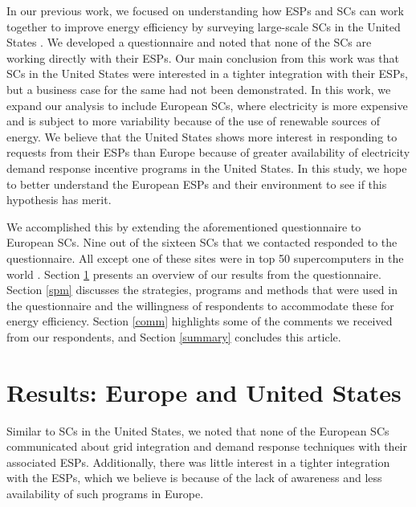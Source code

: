 \documentclass{article}
\begin{document}
In our previous work, we focused on understanding how ESPs and SCs can work together to improve energy efficiency by surveying large-scale SCs in the United States \cite{BatesESP}. We developed a questionnaire and noted that none of the SCs are working directly with their ESPs. Our main conclusion from this work was that SCs in the United States were interested in a tighter integration with their ESPs, but a business case for the same had not been demonstrated. In this work, we expand our analysis to include European SCs, where electricity is more expensive and is subject to more variability because of the use of renewable sources of energy. We believe that the United States shows more interest in responding to requests from their ESPs than Europe because of greater availability of electricity demand response incentive programs in the United States. In this study, we hope to better understand the European ESPs and their environment to see if this hypothesis has merit. 

We accomplished this by extending the aforementioned questionnaire to European SCs. Nine out of the sixteen SCs that we contacted responded to the questionnaire. All except one of these sites were in top 50 supercomputers in the world \cite{Top500}. Section \ref{res} presents an overview of our results from the questionnaire. Section \ref{spm} discusses the strategies, programs and methods that were used in the questionnaire and the willingness of respondents to accommodate these for energy efficiency. Section \ref{comm} highlights some of the comments we received from our respondents, and Section \ref{summary} concludes this article.

\section{Results: Europe and United States}
\label{res}
Similar to SCs in the United States, we noted that none of the European SCs communicated about grid integration and demand response techniques with their associated ESPs. Additionally, there was little interest in a tighter integration with the ESPs, which we believe is because of the lack of awareness and less availability of such programs in Europe.
\end{document}
